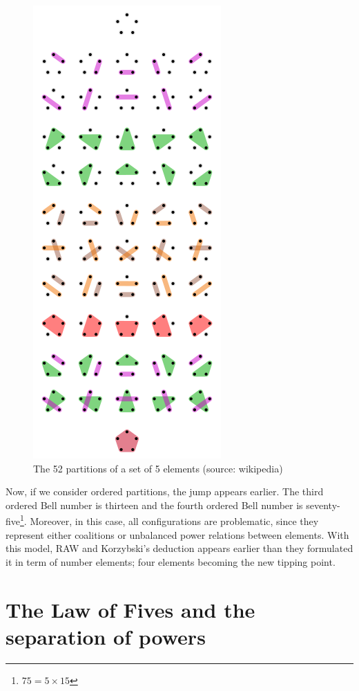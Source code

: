 \begin{figure}
\begin{center}
\includegraphics[scale=0.7]{./img/part.png}
\caption{\label{part} The 52 partitions of a set of 5 elements (source: wikipedia)}
\end{center}
\end{figure}

Now, if we consider ordered partitions, the jump appears earlier. The third ordered Bell number is thirteen and the fourth ordered Bell number is seventy-five\footnote{$75=5\times 15$ }. Moreover, in this case, all configurations are problematic, since they represent either coalitions or unbalanced power relations between elements. With this model, RAW and Korzybski's deduction appears earlier than they formulated it in term of number elements; four elements becoming the new tipping point.


\section*{The Law of Fives and the separation of powers}


